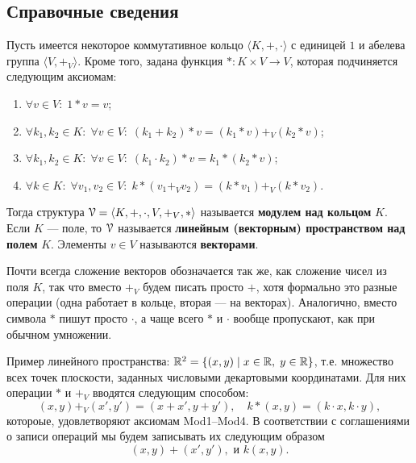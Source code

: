\setcounter{chapter}{64}

\subsection*{Справочные сведения}

Пусть имеется некоторое коммутативное кольцо $\langle K,+,\cdot\rangle$ с единицей $1$ и абелева группа $\langle V,+_V\rangle$. Кроме того, задана функция $*:K\times V\to V$, которая подчиняется следующим аксиомам:
\begin{enumerate}[Mod1]
\item $\forall v\in V:\;1 * v=v$;
\item $\forall k_1,k_2\in K:\;\forall v\in V:\; (k_1+k_2)*v = (k_1*v)+_V(k_2*v)$;
\item $\forall k_1,k_2\in K:\;\forall v\in V:\; (k_1\cdot k_2)*v = k_1*(k_2*v)$;
\item $\forall k\in K:\;\forall v_1,v_2\in V:\; k*(v_1+_V v_2) = (k*v_1)+_V(k*v_2)$.
\end{enumerate}
Тогда структура $\mathcal V=\langle K,+,\cdot,V,+_V,*\rangle$ называется \textbf{модулем над кольцом} $K$.
Если $K$ --- поле, то $\mathcal V$ называется \textbf{линейным (векторным) пространством над полем} $K$. Элементы $v\in V$ называются \textbf{векторами}.

Почти всегда сложение векторов обозначается так же, как сложение чисел из поля $K$, так что вместо $+_V$ будем писать просто $+$, хотя формально это разные операции (одна работает в кольце, вторая --- на векторах). Аналогично, вместо символа $*$ пишут просто $\cdot$, а чаще всего $*$ и $\cdot$ вообще пропускают, как при обычном умножении.

Пример линейного пространства: $\mathbb R^2=\{(x,y)\mid x\in\mathbb R,\;y\in\mathbb R\}$, т.е. множество всех точек плоскости, заданных числовыми декартовыми координатами. Для них операции $*$ и $+_V$ вводятся следующим способом:
$$
(x,y)+_V(x',y') = (x+x',y+y'),\quad k*(x,y)=(k\cdot x,k\cdot y),
$$
котороые, удовлетворяют аксиомам Mod1--Mod4. В соответствии с соглашениями о записи операций мы будем записывать их следующим образом
$$
(x,y)+(x',y'),\mbox{ и }k(x,y).
$$

